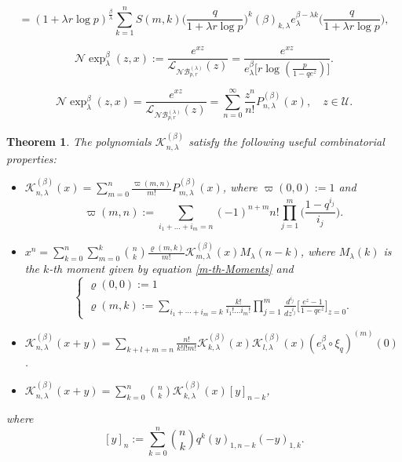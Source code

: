 \documentclass[10pt,a4paper]{amsart}
\newtheorem{thm}{Theorem}
\begin{document}
\begin{equation}\label{m-th-Moments}
=\displaystyle{(1+\lambda r\log p)^{\frac{\beta}{\lambda}}
\sum^{n}_{k=1}S(m, k)\Big(\frac{q}{1+\lambda r\log
p}\Big)^{k}(\beta)_{k, \lambda}e^{\beta-\lambda
k}_{\lambda}\Big(\frac{q}{1+\lambda r\log p}\Big)},
\end{equation}

\begin{equation}\label{wick-exp}
\mathcal{N}\!\exp^{\beta}_{\lambda}(z,
x):=\displaystyle{\frac{e^{xz}}{\mathcal{L}_{\mathcal{N}\mathcal{B}^{(\lambda)}_{p,
r}}(z)}
=\frac{e^{xz}}{e^{\beta}_{\lambda}\big[r\log(\frac{p}{1-qe^{z}})\big]}}.
\end{equation}

\begin{equation}\label{Exp-alpha-1}
\mathcal{N}\!\exp^{\beta}_{\lambda}(z,
x)=\displaystyle{\frac{e^{xz}}{\mathcal{L}_{\mathcal{N}\mathcal{B}^{(\lambda)}_{p,
r}}(z)}= \sum^{\infty}_{n=0}\frac{z^{n}}{n!}P^{(\beta)}_{n,
\lambda}(x)},\quad z\in \mathcal{U}.
\end{equation}

\begin{thm}
The polynomials $\mathcal{K}^{(\beta)}_{n, \lambda}$ satisfy the
following useful combinatorial properties:
\begin{itemize}
\item [\textbf{(P1)}]
$\mathcal{K}^{(\beta)}_{n, \lambda}(x)=\displaystyle{\sum^{n}_{m=0}
\frac{\varpi(m, n)}{m!}P^{(\beta)}_{m, \lambda}(x)}$, where
$\varpi(0, 0):=1$ and
\begin{equation}\label{def-lambda-mn}
\varpi(m,
n):=\displaystyle{\sum_{i_{1}+\ldots+i_{m}=n}(-1)^{n+m}n!\prod^{m}_{j=1}\Big(\frac{1-q^{i_{j}}}{i_{j}}\Big)}.
\end{equation}
\item [\textbf{(P2)}]
$x^{n}=\displaystyle{\sum^{n}_{k=0}\sum^{k}_{m=0}\binom{n}{k}
\frac{\varrho(m, k)}{m!}\mathcal{K}^{(\beta)}_{m,
\lambda}(x)M_{\lambda}(n-k)}$, where $M_{\lambda}(k)$ is the $k$-th
moment given by equation \eqref{m-th-Moments} and
$$\begin{cases}
\varrho(0, 0):=1\\
\varrho(m,
k):=\displaystyle{\sum_{i_{1}+\cdots+i_{m}=k}\frac{k!}{i_{1}!\ldots
i_{m}!}\prod^{m}_{j=1}\frac{d^{i_{j}}}{dz^{i_{j}}}\Big[\frac{e^{z}-1}{1-qe^{z}}\Big]_{z=0}
}.
\end{cases}
$$
\item [\textbf{(P3)}]
$\mathcal{K}^{(\beta)}_{n,
\lambda}(x+y)=\displaystyle{\sum_{k+l+m=n}
\frac{n!}{k!l!m!}\mathcal{K}^{(\beta)}_{k,
\lambda}(x)\mathcal{K}^{(\beta)}_{l,
\lambda}(x)(e^{\beta}_{\lambda}\circ \xi_{q})^{(m)}(0)}$.
\item [\textbf{(P4)}]
$\mathcal{K}^{(\beta)}_{n,
\lambda}(x+y)=\displaystyle{\sum^{n}_{k=0}\binom{n}{k}\mathcal{K}^{(\beta)}_{k,
\lambda}(x)[y]_{n-k}}$,
\end{itemize}
where
\begin{equation}\label{def-of-[y]m}
[y]_{n}:=\displaystyle{\sum^{n}_{k=0}\binom{n}{k}q^{k}(y)_{1,
n-k}(-y)_{1, k}}.
\end{equation}
\end{thm}
\end{document}
